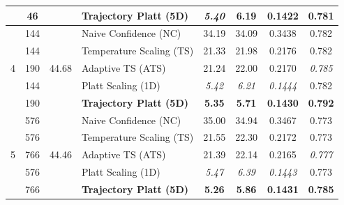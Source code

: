 \begin{table}[t]
{\begin{tabular}{ccclcccc}
 & 46 &  & \textbf{Trajectory Platt (5D)} & \textit{5.40} & \textbf{6.19} & \textbf{0.1422} & \textbf{0.781} \\
\midrule
\multirow{5}{*}{4} & 144 & \multirow{5}{*}{44.68} & Naive Confidence (NC) & 34.19 & 34.09 & 0.3438 & 0.782 \\
 & 144 &  & Temperature Scaling (TS) & 21.33 & 21.98 & 0.2176 & 0.782 \\
 & 190 &  & Adaptive TS (ATS) & 21.24 & 22.00 & 0.2170 & \textit{0.785} \\
 & 144 &  & Platt Scaling (1D) & \textit{5.42} & \textit{6.21} & \textit{0.1444} & 0.782 \\
 & 190 &  & \textbf{Trajectory Platt (5D)} & \textbf{5.35} & \textbf{5.71} & \textbf{0.1430} & \textbf{0.792} \\
\midrule
\multirow{5}{*}{5} & 576 & \multirow{5}{*}{44.46} & Naive Confidence (NC) & 35.00 & 34.94 & 0.3467 & 0.773 \\
 & 576 &  & Temperature Scaling (TS) & 21.55 & 22.30 & 0.2172 & 0.773 \\
 & 766 &  & Adaptive TS (ATS) & 21.39 & 22.14 & 0.2165 & \textit{0.777} \\
 & 576 &  & Platt Scaling (1D) & \textit{5.47} & \textit{6.39} & \textit{0.1443} & 0.773 \\
 & 766 &  & \textbf{Trajectory Platt (5D)} & \textbf{5.26} & \textbf{5.86} & \textbf{0.1431} & \textbf{0.785} \\
\bottomrule
\end{tabular}%
}
\end{table}
